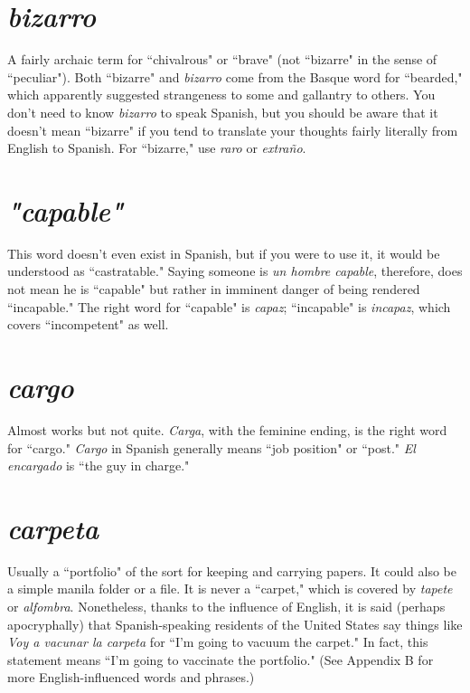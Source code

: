 \section{\emph{bizarro}}

A fairly archaic term for ``chivalrous" or ``brave"
(not ``bizarre" in the sense of ``peculiar"). Both ``bizarre" and \emph{bizarro}
come from the Basque word for ``bearded," which apparently suggested
strangeness to some and gallantry to others. You don't need to know
\emph{bizarro} to speak Spanish, but you should be aware that it doesn't mean
``bizarre" if you tend to translate your thoughts fairly literally from English to Spanish. For ``bizarre," use \emph{raro} or \emph{extraño}.

\section{\emph{"capable"}}

This word doesn't even exist in Spanish, but if
you were to use it, it would be understood as ``castratable." Saying
someone is \emph{un hombre capable}, therefore, does not mean he is ``capable" but rather in imminent danger of being rendered ``incapable."
The right word for ``capable" is \emph{capaz}; ``incapable" is \emph{incapaz}, which
covers ``incompetent" as well.

\section{\emph{cargo}}

Almost works but not quite. \emph{Carga}, with the feminine ending, is the right word for ``cargo." \emph{Cargo} in Spanish generally
means ``job position" or ``post." \emph{El encargado} is ``the guy in charge."

\section{\emph{carpeta}}

Usually a ``portfolio" of the sort for keeping and
carrying papers. It could also be a simple manila folder or a file. It is
never a ``carpet," which is covered by \emph{tapete} or \emph{alfombra}. Nonetheless,
thanks to the influence of English, it is said (perhaps apocryphally) that
Spanish-speaking residents of the United States say things like \emph{Voy a
	vacunar la carpeta} for ``I'm going to vacuum the carpet." In fact, this
statement means ``I'm going to vaccinate the portfolio." (See Appendix
B for more English-influenced words and phrases.)

